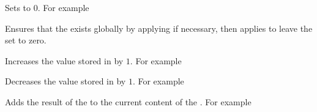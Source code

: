 \documentclass[oneside]{book}
\begin{document}
\begin{function}{\IntZero}
\begin{syntax}
 
\end{syntax}
Sets  to $0$. For example
\begin{demohigh}
\IntSet {}
\IntZero \lTmpaInt
\IntUse \lTmpaInt
\end{demohigh}
\end{function}

\begin{function}{\IntZeroNew}
\begin{syntax}
 
\end{syntax}
Ensures that the  exists globally by applying
 if necessary, then applies  to leave
the  set to zero.
\end{function}

\begin{function}{\IntIncr}
\begin{syntax}
 
\end{syntax}
Increases the value stored in  by $1$.
For example
\begin{demohigh}
\IntSet {}
\IntIncr \lTmpaInt
\IntUse \lTmpaInt
\end{demohigh}
\end{function}

\begin{function}{\IntDecr}
\begin{syntax}
 
\end{syntax}
Decreases the value stored in  by $1$.
For example
\begin{demohigh}
\IntSet {}
\IntDecr \lTmpaInt
\IntUse \lTmpaInt
\end{demohigh}
\end{function}

\begin{function}{\IntAdd}
\begin{syntax}
  
\end{syntax}
Adds the result of the  to the current
content of the . For example
\begin{demohigh}
\IntSet {}
\IntAdd {}
\IntUse \lTmpaInt
\end{demohigh}
\end{function}
\end{document}
